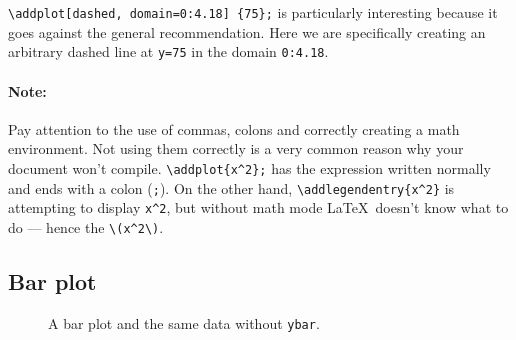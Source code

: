 \verb|\addplot[dashed, domain=0:4.18] {75};| is particularly interesting because it goes against the general recommendation.
Here we are specifically creating an arbitrary dashed line at \verb|y=75| in the domain \verb|0:4.18|.

\paragraph{Note: }
Pay attention to the use of commas, colons and correctly creating a math environment.
Not using them correctly is a very common reason why your document won't compile.
\verb|\addplot{x^2};| has the expression written normally and ends with a colon (\verb|;|).
On the other hand, \verb|\addlegendentry{x^2}| is attempting to display \verb|x^2|, but without math mode \LaTeX\ doesn't know what to do --- hence the \verb|\(x^2\)|.

\subsection{Bar plot}

\begin{figure}[h]\centering
{}
\caption{A bar plot and the same data without \texttt{ybar}.}
\end{figure}

